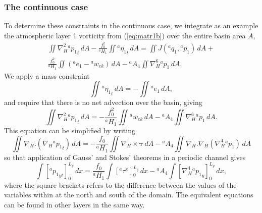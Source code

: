 \documentclass[11pt, a4paper,twoside]{article}
\newcommand{\etb}[2]{{{}^{#1}\eta_{#2}}}
\newcommand{\q}[2]{{{}^{#1}q_{#2}}}
\newcommand{\p}[2]{{{}^{#1}p_{#2}}}
\newcommand{\ek}[1]{{{}^{#1}w_{ek}}}
\newcommand{\HH}[2]{{{}^{#1}H_{#2}}}
\newcommand{\ah}[1]{{{}^{#1}A_4}}
\newcommand{\e}[2]{{{}^{#1}e_{#2}}}
\newcommand{\tx}[2]{{}^{#1}\tau^{#2}}
\numberwithin{equation}{section}
\begin{document}
\subsubsection{The continuous case}
To determine these constraints in the continuous case, we integrate as an example the atmospheric layer 1 vorticity from (\ref{eq:matr1b}) over the entire basin area $A$,
\begin{multline}\label{eq:vortint1}
\iint \nabla_H^2\p{a}{1}_t \, dA  - \frac{f_0^2}{\HH{a}{1}}\iint\etb{a}{1}_t \, dA = \iint J(\q{a}{1},\p{a}{1})\, dA  +\\
  \frac{f_0^2}{\HH{a}{1}}\iint (\e{a}{1} - \ek{a}) \, dA - \ah{a} \iint \nabla_H^6 \p{a}{1} \,dA.
\end{multline}
We apply a mass constraint
\begin{equation}
\iint  \etb{a}{1}_t \, dA= - \iint \e{a}{1} \, dA,
\end{equation}
and require that there is no net advection over the basin, giving
\begin{equation}
\iint \nabla_H^2\p{a}{1}_t \, dA =  - \frac{f_0^2}{\HH{a}{1}}\iint  \ek{a} \, dA - \ah{a} \iint \nabla_H^6 \p{a}{1} \, dA.
\end{equation}
This equation can be simplified by writing
\begin{equation}
\iint \nabla_H.(\nabla_H\p{a}{1}_t) \, dA =  - \frac{f_0}{\HH{a}{1}}\iint \nabla_H \times \mathbf{\tau} \, dA - \ah{a} \iint \nabla_H . \nabla_H(\nabla_H^4 \p{a}{1}) \, dA
\end{equation}
so that application of Gauss' and Stokes' theorems in a periodic channel gives
\begin{equation}  \label{eq:momintd}
\int \left[\p{a}{1}_{yt}\right]_0^{L_y}\, dx = \frac{f_0}{\HH{a}{1}}\int \left[\tx{a}{x}\right]_0^{L_y} \, dx  - \ah{a} \int \left[\nabla_H^4 \p{a}{1}_y\right]_0^{L_y}\, dx,
\end{equation}
where the square brackets refers to the difference between the values of the variables within at the north and south of the domain.
The equivalent equations can be found in other layers in the same way.
\end{document}
